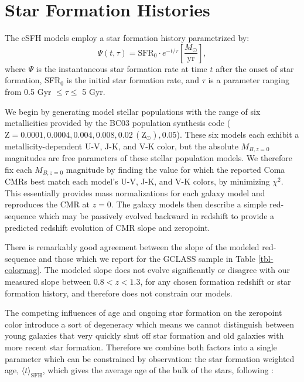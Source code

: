 
\section{Star Formation Histories}\label{appendix}

The eSFH models employ a star formation history parametrized by:
\begin{equation}\label{eq-esfh}
\Psi(t,\tau) = \mathrm{SFR}_0\cdot e^{-t/\tau} \left[ \frac{M_{\odot}}{\mathrm{yr}} \right],
\end{equation}
where $\Psi$ is the instantaneous star formation rate at time $t$ after the onset of star formation, SFR$_0$ is the initial star formation rate, and $\tau$ is a parameter ranging from 0.5 Gyr $\leq \tau \leq$ 5 Gyr.

We begin by generating model stellar populations with the range of six metallicities provided by the BC03 population synthesis code ($\mathrm{Z} = 0.0001, 0.0004, 0.004, 0.008, 0.02\, (\mathrm{Z}_\odot) , 0.05$). These six models each exhibit a metallicity-dependent U-V, J-K, and V-K color, but the absolute $M_{B,z=0}$ magnitudes are free parameters of these stellar population models.
We therefore fix each $M_{B,z=0}$ magnitude by finding the value for which the reported Coma CMRs \citep{Bower:1992mb} best match each model's U-V, J-K, and V-K colors, by minimizing $\chi^2$.
This essentially provides mass normalizations for each galaxy model and reproduces the CMR at $z=0$. The galaxy models then describe a simple red-sequence which may be passively evolved backward in redshift to provide a predicted redshift evolution of CMR slope and zeropoint.

There is remarkably good agreement between the slope of the modeled red-sequence and those which we report for the GCLASS sample in Table \ref{tbl-colormag}. The modeled slope does not evolve significantly or disagree with our measured slope between $0.8 < z < 1.3$, for any chosen formation redshift or star formation history, and therefore does not constrain our models.

The competing influences of age and ongoing star formation on the zeropoint color introduce a sort of degeneracy which means we cannot distinguish between young galaxies that very quickly shut off star formation and old galaxies with more recent star formation. Therefore we combine both factors into a single parameter which can be constrained by observation: the star formation weighted age, $\langle t \rangle_\mathrm{SFH}$, which gives the average age of the bulk of the stars, following \citet{Rettura:2011aa}:

